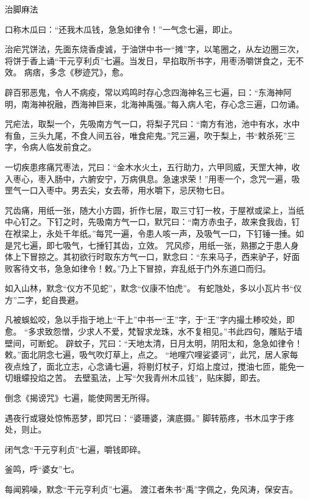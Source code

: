 \documentclass[a4paper,12pt,UTF8,twoside]{ctexbook}
\begin{document}
    治脚麻法
    
    口称木瓜曰：“还我木瓜钱，急急如律令！”一气念七遍，即止。
    
    治疟咒饼法，先面东烧香虔诚，于油饼中书一“摊”字，以笔圈之，从左边圈三次，将饼于香上诵“干元亨利贞”七遍。当发日，早掐取所书字，用枣汤嚼饼食之，无不效。 病痞，多念《秽迹咒》，愈。
    
    辟百邪恶鬼，令人不病疫，常以鸡鸣时存心念四海神名三七遍，曰：“东海神阿明，南海神祝融，西海神巨来，北海神禹强。”每入病人宅，存心念三遍，口勿诵。
    
    咒疟法，取梨一个，先吸南方气一口，将梨子咒曰：“南方有池，池中有水，水中有鱼，三头九尾，不食人间五谷，唯食疟鬼。”咒三遍，吹于梨上，书“敕杀死”三字，令病人临发前食之。
    
    一切疾患疼痛咒枣法，咒曰：“金木水火土，五行助力，六甲同威，天罡大神，收入枣心，枣入肠中，六腑安宁，万病俱息。急速求荣！”用枣一个，念咒一遍，吸罡气一口入枣中。男去尖，女去蒂，用水嚼下，忌厌物七日。
    
    咒齿痛，用纸一张，随大小方圆，折作七层，取三寸钉一枚，于屋袱或梁上，当纸中心钉之。下钉之时，先吸南方气一口，默咒曰：“南方赤虫子，故来食我齿，钉在袱梁上，永处千年纸。”每咒一遍，令患人咳一声，及吸气一口，下钉锤一捶。如是咒七遍，即七吸气，七捶钉其齿，立效。 咒风疹，用纸一张，熟挪之于患人身体上下冒掠之。其初欲行时取东方气一口，默念曰：“东来马子，西来驴子，好面败客待文书，急急如律令！敕。”乃上下冒掠，弃乱纸于门外东道口而归。
    
    如入山林，默念“仪方不见蛇”，默念“仪康不怕虎”。 有蛇虺处，多以小瓦片书“仪方”二字，蛇自畏避。
    
    凡被蜈蚣咬，急以手指于地上“干上”中书一“王”字，于“王”字内撮土糁咬处，即愈。 “多求致怨憎，少求人不爱，梵智求龙珠，水不复相见。”书此四句，雕贴于墙壁间，可断蛇。 辟蚊子，咒曰：“天地太清，日月太明，阴阳太和，急急如律令！敕。”面北阴念七遍，吸气吹灯草上，点之。 “地哩穴哩娑婆诃”，此咒，居人家每夜点烛了，面北立志，心念诵七遍，将剔灯杖子，灯焰上度过，搅油七匝，能免一切蛾蠓投焰之苦。 去壁虱法，上写“欠我青州木瓜钱”，贴床脚，即去。
    
    倒念《揭谤咒》七遍，能使网罟无所得。
    
    遇夜行或寝处惊怖恶梦，即咒曰：“婆珊婆，演底摄。” 脚转筋疼，书木瓜字于疼处，则止。
    
    闭气念“干元亨利贞”七遍，嚼钱即碎。
    
    釜鸣，呼“婆女”七。
    
    每闻鸦噪，默念“干元亨利贞”七遍。 渡江者朱书“禹”字佩之，免风涛，保安吉。
    
\end{document}
